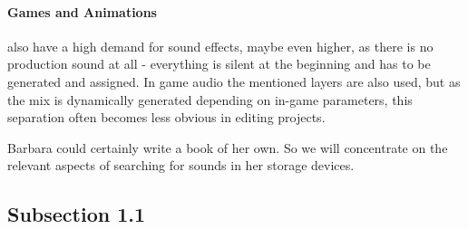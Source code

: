 \paragraph{Games and Animations} also have a high demand for sound effects, maybe even
higher, as there is no production sound at all - everything is silent at the
beginning and has to be generated and assigned. In game audio the
mentioned layers are also used, but as the mix is dynamically generated
depending on in-game parameters, this separation often becomes less
obvious in editing projects.

Barbara could certainly write a book of her own. So we will concentrate on the relevant aspects of searching for sounds in her
storage devices.

\pagebreak

\subsection{Subsection 1.1}
\label{subsec:subsection}








